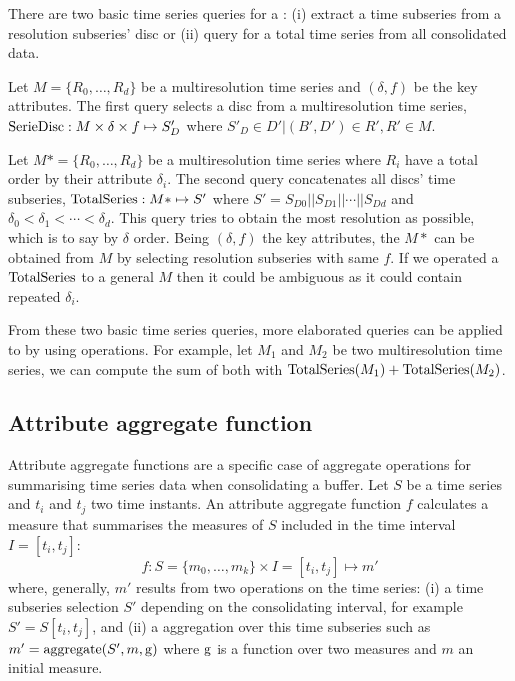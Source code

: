 There are two basic time series queries for a : (i) extract a
time subseries from a resolution subseries' disc or (ii) query for a
total time series from all consolidated data.

Let $M=\{R_0, \dots, R_d\}$ be a multiresolution time series and
$(\delta,f)$ be the key attributes. The first query selects a disc
from a multiresolution time series, $\operatorname{SerieDisc}: M\times \delta \times
f \mapsto S'_D$ where $S'_D \in D' | (B',D') \in R',R' \in M$.

Let $M*=\{R_0, \dots, R_d\}$ be a multiresolution time series where
$R_i$ have a total order by their attribute $\delta_i$.  The second
query concatenates all discs' time subseries, $\operatorname{TotalSeries}: M*
\mapsto S'$ where $S' = S_{D0} || S_{D1} || \cdots || S_{Dd}$ and
$\delta_0 < \delta_1 < \cdots < \delta_d$. This query tries to obtain
the most resolution as possible, which is to say by $\delta$ order.
Being $(\delta,f)$ the key attributes, the $M*$ can be obtained from
$M$ by selecting resolution subseries with same $f$. If we operated a
$\operatorname{TotalSeries}$ to a general $M$ then it could be ambiguous as it could
contain repeated $\delta_i$.


From these two basic time series queries, more elaborated queries can
be applied to  by using  operations. For
example, let $M_1$ and $M_2$ be two multiresolution time series, we
can compute the sum of both with $\operatorname{TotalSeries}(M_1) +
\operatorname{TotalSeries}(M_2)$.





\subsection{Attribute aggregate function}
\label{sec:model:interpolador}

Attribute aggregate functions are a specific case of 
aggregate operations for summarising time series data when
consolidating a buffer. Let $S$ be a time series and $t_i$ and $t_j$
two time instants. An attribute aggregate function $f$ calculates a
measure that summarises the measures of $S$ included in the time
interval $I=[t_i,t_j]$:
\[
f : S=\{m_0,\ldots,m_k\} \times I=[t_i,t_j] \mapsto m'
\]
where, generally, $m'$ results from two operations on the time series:
(i) a time subseries selection $S'$ depending on the consolidating
interval, for example $S' = S[t_i,t_j]$, and (ii) a 
aggregation over this time subseries such as $m' = \operatorname*{aggregate}(S',m, \operatorname*{g})$
where $\operatorname*{g}$ is a function over two measures and $m$ an initial
measure.


